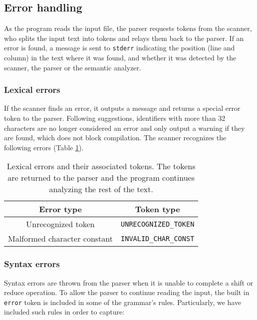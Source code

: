 \documentclass[12pt]{article}
\begin{document}
\subsection{Error handling}
As the program reads the input file, the parser requests tokens from the scanner, who splits the
input text into tokens and relays them back to the parser. If an error is found, a message is
sent to \texttt{stderr} indicating the position (line and column) in the text where it was found,
and whether it was detected by the scanner, the parser or the semantic analyzer.


\subsubsection{Lexical errors}
If the scanner finds an error, it outputs a message and returns a special error token to the parser.
Following suggestions, identifiers with more than 32 characters are no longer considered an error
and only output a warning if they are found, which does not block compilation.
The scanner recognizes the following errors (Table \ref{tab:scanner-errors}).

\begin{table}[h]
\centering
\captionsetup{width=0.7\textwidth}
\caption{Lexical errors and their associated tokens. The tokens are returned
to the parser and the program continues analyzing the rest of the text.}
\label{tab:scanner-errors}
\begin{tabular} {c c}
\hline
Error type & Token type \\
\hline
Unrecognized token & \texttt{UNRECOGNIZED\_TOKEN} \\
Malformed character constant & \texttt{INVALID\_CHAR\_CONST} \\
\hline
\end{tabular}
\end{table}

\subsubsection{Syntax errors}
Syntax errors are thrown from the parser when it is unable to complete a shift or reduce
operation. To allow the parser to continue reading the input, the built in \texttt{error}
token is included in some of the grammar's rules. Particularly, we have included
such rules in order to capture: 
\end{document}
